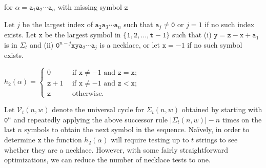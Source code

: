 \documentclass[US-letter,USenglish,authorcolumns,autoref]{lipics-v2021}
\renewcommand{\tt} {\mathtt}
\newenvironment{frshaded2*}{%
    \def\FrameCommand{\fboxrule=\FrameRule\fboxsep=\FrameSep \fcolorbox{lipicsLineGray}{shadecolor}}%
    \MakeFramed {\advance\hsize-\width \FrameRestore}}%
    {\endMakeFramed}
\newenvironment{result}{
 \begin{frshaded2*}
}{%
\end{frshaded2*}

}
\begin{document}
\begin{result} 
 for $\alpha = \tt{a}_1\tt{a}_2\cdots \tt{a}_{n}$ with missing symbol $\tt{z}$ 

\smallskip

\noindent
Let $j$ be the largest index of $\tt{a}_2\tt{a}_3\cdots \tt{a}_{n}$ such that $\tt{a}_j \ne \tt{0}$ or $j=1$ if no such index exists.
Let $\tt{x}$ be the largest symbol in $\{\tt{1,2, \ldots, t{-}1}\}$  such that (i) $\tt{y} = \tt{z}-\tt{x}+\tt{a}_1$ is in $\Sigma_t$ and  (ii) $\tt{0}^{{n}-j}   \tt{x} \tt{y} \tt{a}_2\cdots \tt{a}_{j}$ is a necklace,
or let $\tt{x}=-1$ if no such symbol exists.

\begin{center}  \small
$h_2(\alpha) = \left\{ \begin{array}{ll}
          0 		&\ \   \mbox{if  $\tt{x} \ne -1$ and $\tt{z}  = \tt{x}$;}\\
         \tt{z} {+}1	&\ \  \mbox{if  $\tt{x} \ne -1$ and $\tt{z} < \tt{x}$;}   \ \ \ \ \ \ \ \ \\
         \tt{z} \  	&\ \  \mbox{otherwise.}\end{array} \right.$
\end{center}

\vspace{-0.1in}
\end{result}

\noindent
Let $\mathcal{V}_t(n,w)$ denote the universal cycle for $\Sigma_t(n,w)$ obtained by starting with $\tt{0}^n$ and repeatedly applying the above successor rule $|\Sigma_t(n,w)|- n$ times on the last $n$ symbols to obtain the next symbol in the sequence.  Na\"{i}vely, in order to determine $\tt{x}$ the function $h_2(\alpha)$ will require testing up to $t$ strings to see whether they are a necklace.  
However, with some fairly straightforward optimizations, we can reduce the number of necklace tests to one.
\end{document}
